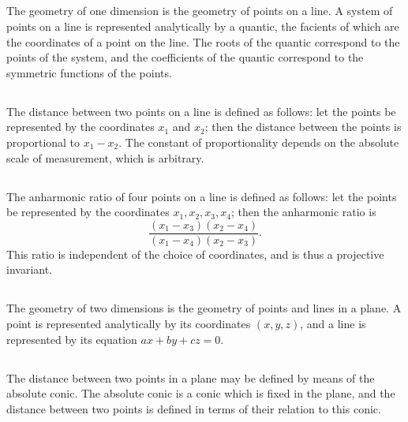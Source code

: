 \documentclass[12pt,a4paper]{article}
\begin{document}
\subsection{}

The geometry of one dimension is the geometry of points on a line. A system of points on a line is represented analytically by a quantic, the facients of which are the coordinates of a point on the line. The roots of the quantic correspond to the points of the system, and the coefficients of the quantic correspond to the symmetric functions of the points.

\subsection{}

The distance between two points on a line is defined as follows: let the points be represented by the coordinates $x_1$ and $x_2$; then the distance between the points is proportional to $x_1 - x_2$. The constant of proportionality depends on the absolute scale of measurement, which is arbitrary.

\subsection{}

The anharmonic ratio of four points on a line is defined as follows: let the points be represented by the coordinates $x_1, x_2, x_3, x_4$; then the anharmonic ratio is
\[
\frac{(x_1 - x_3)(x_2 - x_4)}{(x_1 - x_4)(x_2 - x_3)}.
\]
This ratio is independent of the choice of coordinates, and is thus a projective invariant.

\subsection{}

The geometry of two dimensions is the geometry of points and lines in a plane. A point is represented analytically by its coordinates $(x, y, z)$, and a line is represented by its equation $ax + by + cz = 0$.

\subsection{}

The distance between two points in a plane may be defined by means of the absolute conic. The absolute conic is a conic which is fixed in the plane, and the distance between two points is defined in terms of their relation to this conic.
\end{document}
